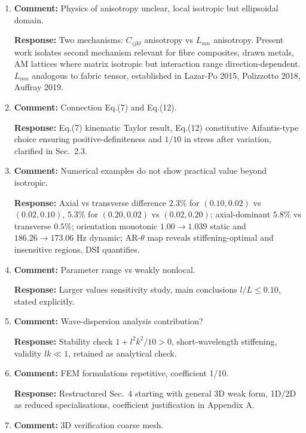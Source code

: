 \documentclass[12pt,a4paper]{article}
\begin{document}
\begin{enumerate}[leftmargin=14pt, itemsep=10pt]

\item \textbf{Comment:} Physics of anisotropy unclear, local isotropic but ellipsoidal domain.

\textbf{Response:} Two mechanisms: $C_{ijkl}$ anisotropy vs $L_{mn}$ anisotropy. Present work isolates second mechanism relevant for fibre composites, drawn metals, AM lattices where matrix isotropic but interaction range direction-dependent. $L_{mn}$ analogous to fabric tensor, established in Lazar-Po 2015, Polizzotto 2018, Auffray 2019.

\item \textbf{Comment:} Connection Eq.(7) and Eq.(12).

\textbf{Response:} Eq.(7) kinematic Taylor result, Eq.(12) constitutive Aifantis-type choice ensuring positive-definiteness and $1/10$ in stress after variation, clarified in Sec.~2.3.

\item \textbf{Comment:} Numerical examples do not show practical value beyond isotropic.

\textbf{Response:} Axial vs transverse difference $2.3\%$ for $(0.10,0.02)$ vs $(0.02,0.10)$, $5.3\%$ for $(0.20,0.02)$ vs $(0.02,0.20)$; axial-dominant $5.8\%$ vs transverse $0.5\%$; orientation monotonic $1.00\to1.039$ static and $186.26\to173.06$ Hz dynamic; AR-$\theta$ map reveals stiffening-optimal and insensitive regions, DSI quantifies.

\item \textbf{Comment:} Parameter range vs weakly nonlocal.

\textbf{Response:} Larger values sensitivity study, main conclusions $l/L\le0.10$, stated explicitly.

\item \textbf{Comment:} Wave-dispersion analysis contribution?

\textbf{Response:} Stability check $1+l^2k^2/10>0$, short-wavelength stiffening, validity $lk\ll1$, retained as analytical check.

\item \textbf{Comment:} FEM formulations repetitive, coefficient 1/10.

\textbf{Response:} Restructured Sec.~4 starting with general 3D weak form, 1D/2D as reduced specialisations, coefficient justification in Appendix A.

\item \textbf{Comment:} 3D verification coarse mesh.


\end{enumerate}
\end{document}

